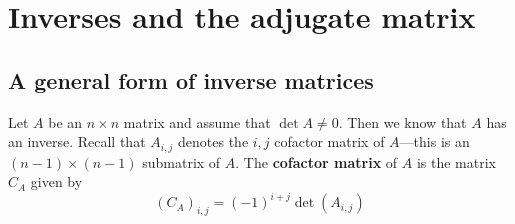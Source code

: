 \documentclass[12pt]{article}
\numberwithin{equation}{subsection}
\numberwithin{figure}{subsection}
\theoremstyle{note}
\begin{document}
\section{Inverses and the adjugate matrix}\label{ap-adjugate}

\subsection{A general form of inverse matrices}
Let $A$ be an $n\times n$ matrix and assume that $\det{A}\neq 0$. Then we know that $A$ has an inverse. Recall that $A_{i,j}$ denotes the $i,j$ cofactor matrix of $A$---this is an $(n-1)\times (n-1)$ submatrix of $A$. The \textbf{cofactor matrix} of $A$ is the matrix $C_A$ given by \begin{equation} (C_A)_{i,j}= (-1)^{i+j} \det(A_{i,j})\end{equation}
\end{document}
